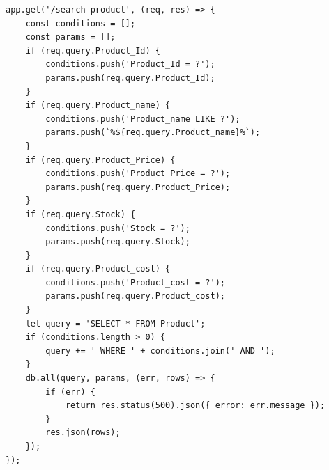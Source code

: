 \documentclass{report}
\begin{document}
\begin{verbatim}
app.get('/search-product', (req, res) => {
    const conditions = [];
    const params = [];
    if (req.query.Product_Id) {
        conditions.push('Product_Id = ?');
        params.push(req.query.Product_Id);
    }
    if (req.query.Product_name) {
        conditions.push('Product_name LIKE ?');
        params.push(`%${req.query.Product_name}%`);
    }
    if (req.query.Product_Price) {
        conditions.push('Product_Price = ?');
        params.push(req.query.Product_Price);
    }
    if (req.query.Stock) {
        conditions.push('Stock = ?');
        params.push(req.query.Stock);
    }
    if (req.query.Product_cost) {
        conditions.push('Product_cost = ?');
        params.push(req.query.Product_cost);
    }
    let query = 'SELECT * FROM Product';
    if (conditions.length > 0) {
        query += ' WHERE ' + conditions.join(' AND ');
    }
    db.all(query, params, (err, rows) => {
        if (err) {
            return res.status(500).json({ error: err.message });
        }
        res.json(rows);
    });
});
\end{verbatim}
\end{document}
